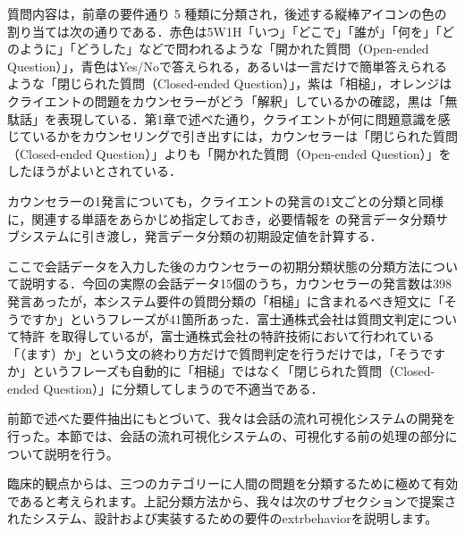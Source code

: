 \documentclass[shuuron]{kuee}
\begin{document}
質問内容は，前章の要件通り 5 種類に分類され，後述する縦棒アイコンの色の割り当ては次の通りである．赤色は5W1H「いつ」「どこで」「誰が」「何を」「どのように」「どうした」などで問われるような「開かれた質問（Open-ended Question）」，青色はYes/Noで答えられる，あるいは一言だけで簡単答えられるような「閉じられた質問（Closed-ended Question）」，紫は「相槌」，オレンジはクライエントの問題をカウンセラーがどう「解釈」しているかの確認，黒は「無駄話」を表現している．第1章で述べた通り，クライエントが何に問題意識を感じているかをカウンセリングで引き出すには，カウンセラーは「閉じられた質問（Closed-ended Question）」よりも「開かれた質問（Open-ended Question）」をしたほうがよいとされている．


カウンセラーの1発言についても，クライエントの発言の1文ごとの分類と同様に，関連する単語をあらかじめ指定しておき，必要情報を
の発言データ分類サブシステムに引き渡し，発言データ分類の初期設定値を計算する．

ここで会話データを入力した後のカウンセラーの初期分類状態の分類方法について説明する．今回の実際の会話データ15個のうち，カウンセラーの発言数は398発言あったが，本システム要件の質問分類の「相槌」に含まれるべき短文に「そうですか」というフレーズが41箇所あった．富士通株式会社は質問文判定について特許
を取得しているが，富士通株式会社の特許技術において行われている「（ます）か」という文の終わり方だけで質問判定を行うだけでは，「そうですか」というフレーズも自動的に「相槌」ではなく「閉じられた質問（Closed-ended Question）」に分類してしまうので不適当である．



前節で述べた要件抽出にもとづいて、我々は会話の流れ可視化システムの開発を行った。本節では、会話の流れ可視化システムの、可視化する前の処理の部分について説明を行う。



  臨床的観点からは、三つのカテゴリーに人間の問題を分類するために極めて有効であると考えられます。上記分類方法から、我々は次のサブセクションで提案されたシステム、設計および実装するための要件のextrbehaviorを説明します。
\end{document}
